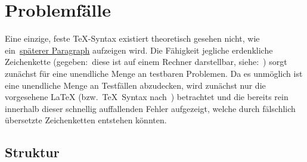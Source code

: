 


\section{Problemfälle}
Eine einzige, feste \TeX{}-Syntax existiert theoretisch gesehen nicht, wie ein~\hyperref[problems:advanced:catcode]{späterer Paragraph} aufzeigen wird.%
Die Fähigkeit jegliche erdenkliche Zeichenkette (gegeben:\ diese ist auf einem Rechner darstellbar, siehe:~\cite{unicode}) sorgt zunächst für eine unendliche Menge an testbaren Problemen. Da es unmöglich ist eine unendliche Menge an Testfällen abzudecken, wird zunächst nur die vorgesehene \LaTeX{} (bzw.\ \TeX{}~Syntax nach~\cite{texbook}) betrachtet und die bereits rein innerhalb dieser schnellig auffallenden Fehler aufgezeigt, welche durch fälschlich übersetzte Zeichenketten entstehen könnten.\\\noindent
% 
\subsection{Struktur}\label{problems:structure}%
